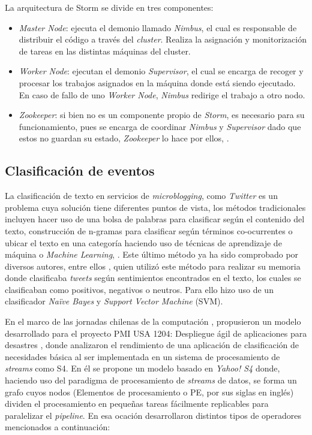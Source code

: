La arquitectura de Storm se divide en tres componentes:

\begin{itemize}
\item \textit{Master Node}: ejecuta el demonio llamado \textit{Nimbus}, el cual es responsable de distribuir el código a través del \textit{cluster}. Realiza la asignación y monitorización de tareas en las distintas máquinas del cluster.
\item \textit{Worker Node}: ejecutan el demonio \textit{Supervisor}, el cual se encarga de recoger y procesar los trabajos asignados en la máquina donde está siendo ejecutado. En caso de fallo de uno \textit{Worker Node}, \textit{Nimbus} redirige el trabajo a otro nodo.
\item \textit{Zookeeper}: si bien no es un componente propio de \textit{Storm}, es necesario para su funcionamiento, pues se encarga de coordinar \textit{Nimbus} y \textit{Supervisor} dado que estos no guardan su estado, \textit{Zookeeper} lo hace por ellos, \citep{StormState}.
\end{itemize}	

\subsection{Clasificación de eventos}
\label{intro:ea:clasificacion}

La clasificación de texto en servicios de \textit{microblogging}, como \textit{Twitter} es un problema cuya solución tiene diferentes puntos de vista, los métodos tradicionales incluyen hacer uso de una bolsa de palabras para clasificar según el contenido del texto, construcción de n-gramas para clasificar según términos co-ocurrentes o ubicar el texto en una categoría haciendo uso de técnicas de aprendizaje de máquina o \textit{Machine Learning}, \citep{EventDetection}. 
Este último método ya ha sido comprobado por diversos autores, entre ellos \citep{Maldonado}, quien utilizó este método para realizar su memoria donde clasificaba \textit{tweets} según sentimientos encontrados en el texto, los cuales se clasificaban como positivos, negativos o neutros. Para ello hizo uso de un clasificador \textit{Naïve Bayes} y \textit{Support Vector Machine} (SVM). 

En el marco de las jornadas chilenas de la computación \citep{WladdimiroPMI}, propusieron un modelo desarrollado para el proyecto PMI USA 1204: Despliegue ágil de aplicaciones para desastres \citep{PMIProfes}, donde analizaron el rendimiento de una aplicación de clasificación de necesidades básica al ser implementada en un sistema de procesamiento de \textit{streams} como S4. En él se propone un modelo basado en \textit{Yahoo! S4} donde, haciendo uso del paradigma de procesamiento de \textit{streams} de datos, se forma un grafo cuyos nodos (Elementos de procesamiento o PE, por sus siglas en inglés) dividen el procesamiento en pequeñas tareas fácilmente replicables para paralelizar el \textit{pipeline}. En esa ocación desarrollaron distintos tipos de operadores mencionados a continuación:

